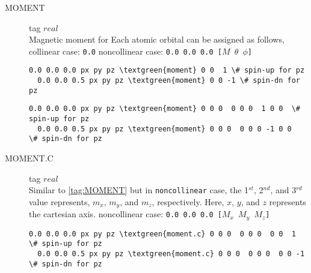 \documentclass[a4paper,12pt]{scrartcl}
\makeatletter
\def\namedlabel#1#2{\begingroup
    #2%
    \def\@currentlabel{#2}%
    \phantomsection\label{#1}\endgroup
}
\newcommand{\textgreen}[1]{\textcolor{green!50!black}{\texttt{#1}}}
\makeatother
\begin{document}
\begin{description}
\begin{Verbatim}[commandchars=\\\{\},gobble=4, frame=single, framesep=2mm, 
    label= setup of custumized atomic orbital name $cp1$,
    labelposition=bottomline]
\end{Verbatim}


    \item[\namedlabel{tag:MOMENT}{MOMENT}] tag $real$ \\
		Magnetic moment for Each atomic orbital can be assigned as follows,
	\subitem collinear case: \texttt{0.0}
    \subitem noncollinear case: \texttt{0.0 0.0 0.0 [$M$ $\theta$ $\phi$]}\\
\begin{Verbatim}[commandchars=\\\{\},gobble=4, frame=single, framesep=2mm, 
    label= usage of $moment$ tag in \ref{tag:GFILE} with $collinear$ magnetism,
    labelposition=bottomline]
  0.0 0.0 0.0 px py pz \textgreen{moment} 0 0  1 \# spin-up for pz
  0.0 0.0 0.5 px py pz \textgreen{moment} 0 0 -1 \# spin-dn for pz

\end{Verbatim}

\begin{Verbatim}[commandchars=\\\{\},gobble=4, frame=single, framesep=2mm, 
    label= usage of $moment$ tag in \ref{tag:GFILE} with $noncollinear$ magnetism,
    labelposition=bottomline]
  0.0 0.0 0.0 px py pz \textgreen{moment} 0 0 0  0 0 0  1 0 0  \# spin-up for pz
  0.0 0.0 0.5 px py pz \textgreen{moment} 0 0 0  0 0 0 -1 0 0  \# spin-dn for pz

\end{Verbatim}

    \item[\namedlabel{tag:MOMENT.C}{MOMENT.C}] tag $real$ \\
        Similar to \ref{tag:MOMENT} but in \texttt{noncollinear} case,
		the 1$^{st}$, 2$^{nd}$, and 3$^{rd}$ value represents, $m_x$, $m_y$, and $m_z$, respectively.
		Here, $x$, $y$, and $z$ represents the cartesian axis.
    \subitem noncollinear case: \texttt{0.0 0.0 0.0 [$M_x$ $M_y$ $M_z$]}\\

\begin{Verbatim}[commandchars=\\\{\},gobble=4, frame=single, framesep=2mm, 
    label= usage of $moment.c$ tag in \ref{tag:GFILE} with $noncollinear$ magnetism,
    labelposition=bottomline]
  0.0 0.0 0.0 px py pz \textgreen{moment.c} 0 0 0  0 0 0  0 0  1 \# spin-up for pz
  0.0 0.0 0.5 px py pz \textgreen{moment.c} 0 0 0  0 0 0  0 0 -1 \# spin-dn for pz

\end{Verbatim}

\end{description}
\end{document}
